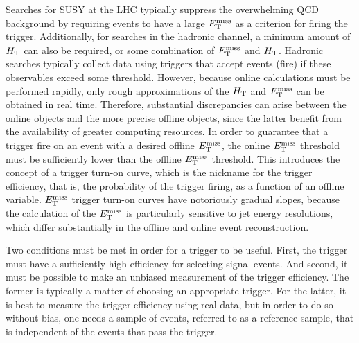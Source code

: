 \label{sec:hadronictrigger}
Searches for SUSY at the LHC typically suppress the overwhelming QCD background by requiring events to have a large $E_{\text{T}}^{\rm miss}$ as a criterion for firing the trigger. Additionally, for searches in the hadronic channel, a minimum amount of $H_{\rm T}$ can also be required, or some combination of $E_{\text{T}}^{\rm miss}$ and $H_{\rm T}$. Hadronic searches typically collect data using triggers that accept events (fire) if these observables exceed some threshold. However, because online calculations must be performed rapidly, only rough approximations of the $H_{\rm T}$ and $E_{\text{T}}^{\rm miss}$ can be obtained in real time. Therefore, substantial discrepancies can arise between the online objects and the more precise offline objects, since the latter benefit from the availability of greater computing resources. In order to guarantee that a trigger fire on an event with a desired offline $E_{\text{T}}^{\rm miss}$, the online $E_{\text{T}}^{\rm miss}$ threshold must be sufficiently lower than the offline $E_{\text{T}}^{\rm miss}$ threshold. This introduces the concept of a trigger turn-on curve, which is the nickname for the trigger efficiency, that is, the probability of the trigger firing, as a function of an offline variable. $E_{\text{T}}^{\rm miss}$ trigger turn-on curves have notoriously gradual slopes, because the calculation of the $E_{\text{T}}^{\rm miss}$ is particularly sensitive to jet energy resolutions, which differ substantially in the offline and online event reconstruction.

Two conditions must be met in order for a trigger to be useful. First, the trigger must have a sufficiently high efficiency for selecting signal events. And second, it must be possible to make an unbiased measurement of the trigger efficiency. The former is typically a matter of choosing an appropriate trigger. For the latter, it is best to measure the trigger efficiency using real data, but in order to do so without bias, one needs a sample of events, referred to as a reference sample, that is independent of the events that pass the trigger. 


